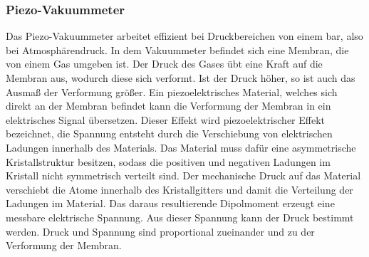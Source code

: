 \subsubsection{Piezo-Vakuummeter}
Das Piezo-Vakuummeter arbeitet effizient bei Druckbereichen von einem bar, also bei Atmosphärendruck.
In dem Vakuummeter befindet sich eine Membran, die von einem Gas umgeben ist. Der Druck des Gases übt eine Kraft auf die Membran aus,
wodurch diese sich verformt. Ist der Druck höher, so ist auch das Ausmaß der Verformung größer. Ein piezoelektrisches Material, welches sich direkt
an der Membran befindet kann die Verformung der Membran in ein elektrisches Signal übersetzen. Dieser Effekt wird piezoelektrischer Effekt bezeichnet, 
die Spannung entsteht durch die Verschiebung von elektrischen Ladungen innerhalb des Materials. Das Material muss dafür eine asymmetrische Kristallstruktur 
besitzen, sodass die positiven und negativen Ladungen im Kristall nicht symmetrisch verteilt sind. Der mechanische Druck auf das Material verschiebt die 
Atome innerhalb des Kristallgitters und damit die Verteilung der Ladungen im Material. Das daraus resultierende Dipolmoment erzeugt eine messbare elektrische
Spannung. Aus dieser Spannung kann der Druck bestimmt werden. Druck und Spannung sind proportional zueinander und zu der Verformung der Membran. 
\cite{Vakuummeter}
